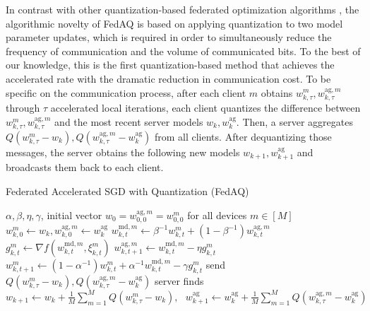 \documentclass[11pt]{article}
\begin{document}
In contrast with other quantization-based federated optimization algorithms \cite{Yeojoon-reisizadeh2020fedpaq, Yeojoon-haddadpour2021federated}, the algorithmic novelty of FedAQ is based on applying quantization to two model parameter updates, which is required in order to simultaneously reduce the frequency of communication and the volume of communicated bits. To the best of our knowledge, this is the first quantization-based method that achieves the accelerated rate with the dramatic reduction in communication cost.
To be specific on the communication process, after each client $m$ obtains $w_{k, \tau}^m, w_{k, \tau}^{\textrm{ag}, m}$ through $\tau$ accelerated local iterations, each client quantizes the difference between $w_{k, \tau}^m, w_{k, \tau}^{\textrm{ag}, m}$ and the most recent server models $w_k, w_k^{\textrm{ag}}$. Then, a server aggregates $Q(w_{k, \tau}^m - w_k), Q(w_{k, \tau}^{\textrm{ag}, m} - w_k^{\textrm{ag}})$ from all clients. After dequantizing those messages, the server obtains the following new models $w_{k+1}, w_{k+1}^{\textrm{ag}}$ and broadcasts them back to each client.

\begin{algorithm} %
\caption{Federated Accelerated SGD with Quantization (FedAQ)}\label{algorithm1}
\begin{algorithmic}[1]
 $\alpha, \beta, \eta, \gamma$, initial vector $w_0 = w_{0, 0}^{\textrm{ag}, m} = w_{0, 0}^m$ for all devices $m \in [M]$
\State $w_{k, 0}^m \leftarrow w_k, w_{k, 0}^{\textrm{ag}, m} \leftarrow w_k^{\textrm{ag}}$
\State $w_{k, t}^{\textrm{md}, m} \leftarrow \beta^{-1}w_{k, t}^m + (1-\beta^{-1})w_{k, t}^{\textrm{ag}, m}$
\State $g_{k, t}^m \leftarrow \nabla f(w_{k, t}^{\textrm{md}, m}, \xi_{k, t}^m)$
\State $w_{k, t+1}^{\textrm{ag}, m} \leftarrow w_{k, t}^{\textrm{md}, m} - \eta g_{k, t}^m $
\State $w_{k, t+1}^m \leftarrow (1-\alpha^{-1})w_{k, t}^m + \alpha^{-1} w_{k, t}^{\textrm{md}, m} - \gamma g_{k, t}^m$
\EndFor
\State send $Q(w_{k, \tau}^m - w_k), Q(w_{k, \tau}^{\textrm{ag}, m} - w_k^{\textrm{ag}})$
\EndFor
\State server finds $w_{k+1} \leftarrow w_k + \frac{1}{M}\sum\limits_{m=1}^M Q(w_{k, \tau}^m - w_k), \textrm{ } w_{k+1}^{\textrm{ag}} \leftarrow w_k^{\textrm{ag}} + \frac{1}{M} \sum\limits_{m=1}^M Q(w_{k, \tau}^{\textrm{ag}, m} - w_k^{\textrm{ag}})$
\EndFor

\end{algorithmic}
\end{algorithm}
\end{document}
